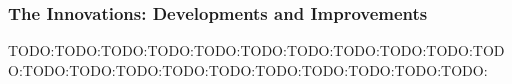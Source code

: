 





\subsubsection{The Innovations: Developments and Improvements}
TODO:TODO:TODO:TODO:TODO:TODO:TODO:TODO:TODO:TODO:TODO:TODO:TODO:TODO:TODO:TODO:TODO:TODO:TODO:TODO:TODO:

